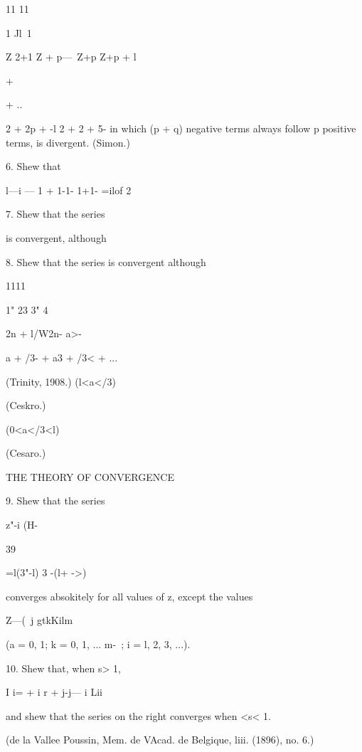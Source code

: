 11 11 



1 Jl\  1 

Z 2+1     Z + p—\ Z+p Z+p + l 



+ 



+ .. 



2 + 2p +  -l 2 + 2  + 5- 
in which (p + q) negative terms always follow p positive terms, is divergent. (Simon.) 

6. Shew that 

l—i — 1 + 1-1- 1+1- =ilof 2 

7. Shew that the series 



is convergent, although 

8. Shew that the series 
is convergent although 



1111 

1"   23 3" 4  



 2n + l/W2n- a>- 

a + /3- + a3 + /3< + ... 



(Trinity, 1908.) 
(l<a</3) 



(Ceskro.) 

(0<a</3<l) 

(Cesaro.) 



THE THEORY OF CONVERGENCE 

9. Shew that the series 

   z"-i (H-%



39 



 =l(3"-l) 3 -(l+ ->)   

converges absokitely for all values of z, except the values 

Z—(\ j gtkKilm 

(a = 0, 1; k = 0, 1, ... m-\ ;  i = l, 2, 3, ...). 

10. Shew that, when s> 1, 

I i= + i r  + j-j— i Lii 

and shew that the series on the right converges when <s< 1. 

(de la Vallee Poussin, Mem. de VAcad. de Belgique, liii. (1896), no. 6.) 

